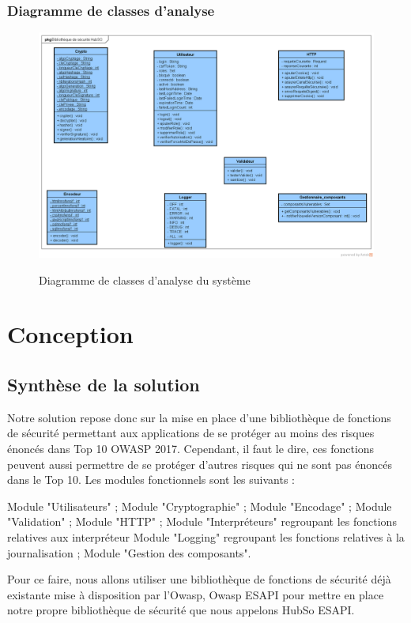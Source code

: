 \subsubsection{Diagramme de classes d'analyse}
\begin{figure}[H]
	\centering
	\begin{minipage}{12cm}
		\centering
		{\includegraphics[height=0.5\textheight, width=1.2\textwidth]{fig/Analyse-Class-Diagram.png}}
	\end{minipage}
	\caption{Diagramme de classes d'analyse du système}
	\label{fig:7.20}
\end{figure}

\section{Conception}
\subsection{Synthèse de la solution}
Notre solution repose donc sur la mise en place d'une bibliothèque de fonctions de sécurité permettant aux applications de se protéger au moins des risques énoncés dans Top 10 OWASP 2017. Cependant, il faut le dire, ces fonctions peuvent aussi permettre de se protéger d'autres risques qui ne sont pas énoncés dans le Top 10. Les modules fonctionnels sont les suivants :
\begin{itemize}
	\itemcheck Module "Utilisateurs" ;
	\itemcheck Module "Cryptographie" ; 
	\itemcheck Module "Encodage" ; 
	\itemcheck Module "Validation" ; 
	\itemcheck Module "HTTP" ;
	\itemcheck Module "Interpréteurs" regroupant les fonctions relatives aux interpréteur
	\itemcheck Module "Logging" regroupant les fonctions relatives à la journalisation ; 
	\itemcheck Module "Gestion des composants".
\end{itemize}
Pour ce faire, nous allons utiliser une bibliothèque de fonctions de sécurité déjà existante mise à disposition par l'Owasp, Owasp ESAPI pour mettre en place notre propre bibliothèque de sécurité que nous appelons HubSo ESAPI.
